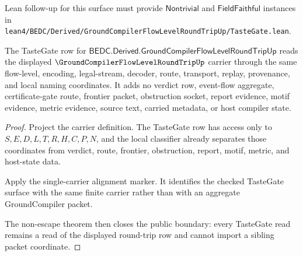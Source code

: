 
Lean follow-up for this surface must provide $\mathsf{Nontrivial}$ and $\mathsf{FieldFaithful}$ instances in \texttt{lean4/BEDC/Derived/GroundCompilerFlowLevelRoundTripUp/TasteGate.lean}.

\begin{theorem}
\label{thm:groundcompiler-flow-level-round-trip-tastegate-row}
The TasteGate row for $\mathsf{BEDC.Derived.GroundCompilerFlowLevelRoundTripUp}$ reads the displayed $\GroundCompilerFlowLevelRoundTripUp$ carrier through the same flow-level, encoding, legal-stream, decoder, route, transport, replay, provenance, and local naming coordinates. It adds no verdict row, event-flow aggregate, certificate-gate route, frontier packet, obstruction socket, report evidence, motif evidence, metric evidence, source text, carried metadata, or host compiler state.
\end{theorem}
\begin{proof}
Project the carrier definition. The TasteGate row has access only to $S,E,D,L,T,R,H,C,P,N$, and the local classifier already separates those coordinates from verdict, route, frontier, obstruction, report, motif, metric, and host-state data.

Apply the single-carrier alignment marker. It identifies the checked TasteGate surface with the same finite carrier rather than with an aggregate GroundCompiler packet.

The non-escape theorem then closes the public boundary: every TasteGate read remains a read of the displayed round-trip row and cannot import a sibling packet coordinate.
\end{proof}

